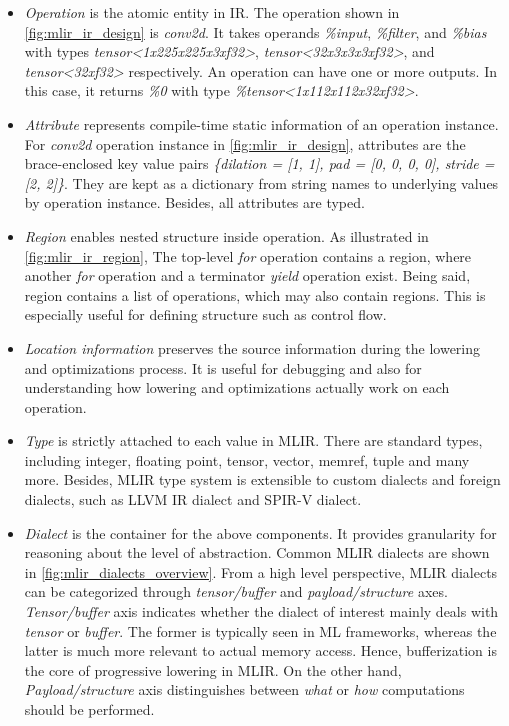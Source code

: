 \begin{itemize}
    \item \textit{Operation} is the atomic entity in IR. The operation shown in \cref{fig:mlir_ir_design} is \textit{conv2d}. It takes operands \textit{\%input}, \textit{\%filter}, and \textit{\%bias} with types \textit{tensor<1x225x225x3xf32>}, \textit{tensor<32x3x3x3xf32>}, and \textit{tensor<32xf32>} respectively. An operation can have one or more outputs. In this case, it returns \textit{\%0} with type \textit{\%tensor<1x112x112x32xf32>}.
    \item \textit{Attribute} represents compile-time static information of an operation instance. For \textit{conv2d} operation instance in \cref{fig:mlir_ir_design}, attributes are the brace-enclosed key value pairs \textit{\{dilation = [1, 1], pad = [0, 0, 0, 0], stride = [2, 2]\}}. They are kept as a dictionary from string names to underlying values by operation instance. Besides, all attributes are typed.
    \item \textit{Region} enables nested structure inside operation. As illustrated in \cref{fig:mlir_ir_region}, The top-level \textit{for} operation contains a region, where another \textit{for} operation and a terminator \textit{yield} operation exist. Being said, region contains a list of operations, which may also contain regions. This is especially useful for defining structure such as control flow.
    \item \textit{Location information} preserves the source information during the lowering and optimizations process. It is useful for debugging and also for understanding how lowering and optimizations actually work on each operation. 
    \item \textit{Type} is strictly attached to each value in MLIR. There are standard types, including integer, floating point, tensor, vector, memref, tuple and many more. Besides, MLIR type system is extensible to custom dialects and foreign dialects, such as LLVM IR dialect and SPIR-V dialect.
    \item \textit{Dialect} is the container for the above components. It provides granularity for reasoning about the level of abstraction. Common MLIR dialects are shown in \cref{fig:mlir_dialects_overview}. From a high level perspective, MLIR dialects can be categorized through \textit{tensor/buffer} and \textit{payload/structure} axes. \textit{Tensor/buffer} axis indicates whether the dialect of interest mainly deals with \textit{tensor} or \textit{buffer}. The former is typically seen in ML frameworks, whereas the latter is much more relevant to actual memory access. Hence, bufferization is the core of progressive lowering in MLIR. On the other hand, \textit{Payload/structure} axis distinguishes between \textit{what} or \textit{how} computations should be performed\cite{alexmlir}.
\end{itemize}

